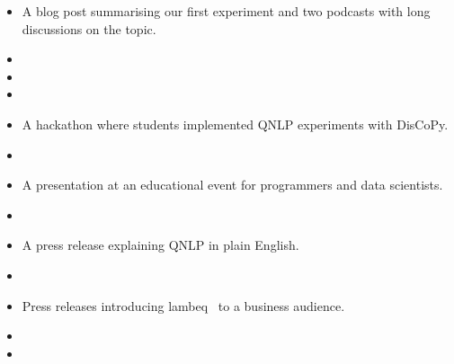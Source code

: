 \begin{itemize}
\item A blog post summarising our first experiment and two podcasts with long discussions on the topic.
\end{itemize}
\begin{itemize}[label={}]
\item {}\vspace{-10pt}
\item {}\vspace{-10pt}
\item {}\vspace{-10pt}
\end{itemize}

\begin{itemize}
\item A hackathon where students implemented QNLP experiments with DisCoPy.
\end{itemize}
\begin{itemize}[label={}]
\item {}\vspace{-10pt}
\end{itemize}

\begin{itemize}
\item A presentation at an educational event for programmers and data scientists.
\end{itemize}
\begin{itemize}[label={}]
\item {}
\end{itemize} \pagebreak

\begin{itemize}
\item A press release explaining QNLP in plain English.
\end{itemize}
\begin{itemize}[label={}]
\item {}\vspace{-10pt}
\end{itemize}

\begin{itemize}
\item Press releases introducing lambeq~\cite{KartsaklisEtAl21} to a business audience.
\end{itemize}
\begin{itemize}[label={}]
\item {}\vspace{-10pt}
\item {}\vspace{-10pt}
\end{itemize}
